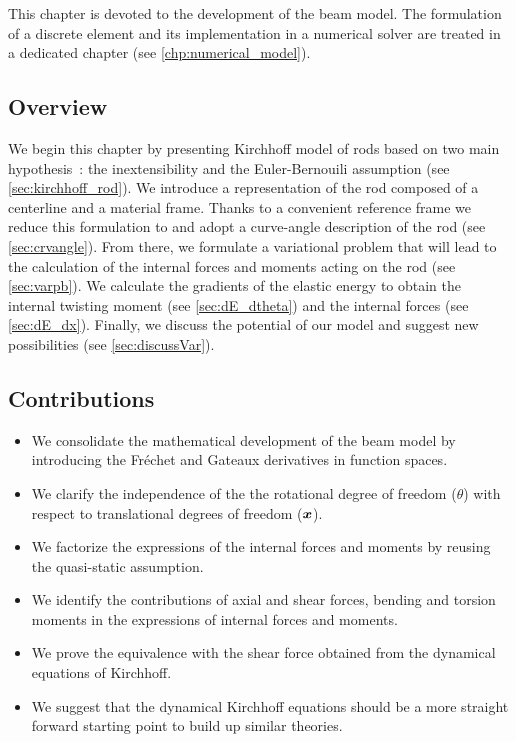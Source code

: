 This chapter is devoted to the development of the beam model. The formulation of a discrete element and its implementation in a numerical solver are treated in a dedicated chapter (see \cref{chp:numerical_model}).

\subsection{Overview}
We begin this chapter by presenting Kirchhoff model of rods based on two main hypothesis~: the inextensibility and the Euler-Bernouili assumption (see \cref{sec:kirchhoff_rod}). We introduce a  representation of the rod composed of a centerline and a material frame. Thanks to a convenient reference frame we reduce this formulation to  and adopt a curve-angle description of the rod (see \cref{sec:crvangle}). From there, we formulate a variational problem that will lead to the calculation of the internal forces and moments acting on the rod (see \cref{sec:varpb}). We calculate the gradients of the elastic energy to obtain the internal twisting moment (see \cref{sec:dE_dtheta}) and the internal forces (see \cref{sec:dE_dx}). Finally, we discuss the potential of our model and suggest new possibilities (see \cref{sec:discussVar}).

\subsection{Contributions}
\begin{itemize}
\item We consolidate the mathematical development of the beam model by introducing the Fréchet and Gateaux derivatives in function spaces.
\item We clarify the independence of the the rotational degree of freedom ($\theta$) with respect to  translational degrees of freedom ($\boldsymbol{x}$).
\item We factorize the expressions of the internal forces and moments by reusing the quasi-static assumption.
\item We identify the contributions of axial and shear forces, bending and torsion moments in the expressions of internal forces and moments.
\item We prove the equivalence with the shear force obtained from the dynamical equations of Kirchhoff.
\item We suggest that the dynamical Kirchhoff equations should be a more straight forward starting point to build up similar theories.
\end{itemize}

